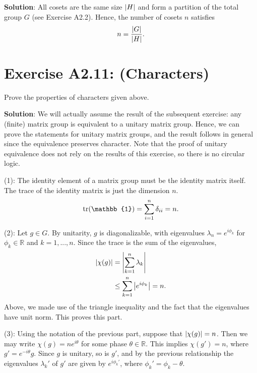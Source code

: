 \documentclass{book}
\begin{document}
    \textbf{Solution}: All cosets are the same size $\abs{H}$ and form a partition of the total group $G$ (see Exercise A2.2). Hence, the number of cosets $n$ satisfies
    \begin{align}
        n = \frac{\abs{G}}{\abs{H}}.
    \end{align}

\section*{Exercise A2.11: (Characters)}
    Prove the properties of characters given above.
    
    \textbf{Solution}: We will actually assume the result of the subsequent exercise: any (finite) matrix group is equivalent to a unitary matrix group. Hence, we can prove the statements for unitary matrix groups, and the result follows in general since the equivalence preserves character. Note that the proof of unitary equivalence does not rely on the results of this exercise, so there is no circular logic. 
    
    (1): The identity element of a matrix group must be the identity matrix itself. The trace of the identity matrix is just the dimension $n$.
    \begin{align}
        \tr(\mathbb{1}) = \sum_{i=1}^n \delta_{ii} = n.
    \end{align}
    
    (2): Let $g\in G$. By unitarity, $g$ is diagonalizable, with eigenvalues $\lambda_n = e^{i\phi_k}$ for $\phi_k\in \mathbb{R}$ and $k=1,...,n$. Since the trace is the sum of the eigenvalues,
    \begin{align}
        \abs{\chi(g)} &= \abs{\sum_{k=1}^n \lambda_k} \\
        &\leq \sum_{k=1}^n \abs{e^{i\phi_k}} = n.
    \end{align}
    Above, we made use of the triangle inequality and the fact that the eigenvalues have unit norm. This proves this part.
    
    (3): Using the notation of the previous part, suppose that $\abs{\chi(g)} = n$. Then we may write $\chi(g) = n e^{i\theta}$ for some phase $\theta\in \mathbb{R}$. This implies $\chi(g') = n$, where $g' = e^{-i\theta} g$. Since $g$ is unitary, so is $g'$, and by the previous relationship the eigenvalues $\lambda_k'$ of $g'$ are given by $e^{i\phi_k'}$, where $\phi_k'=\phi_k-\theta$. 
    
\end{document}

